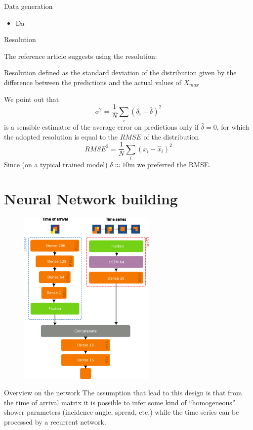 \documentclass{beamer}
\begin{document}
\begin{frame}{Data generation}
    \begin{itemize}
        \item Da
    \end{itemize}
\end{frame}


\begin{frame}{Resolution}

    The reference article suggests using the resolution:
    \begin{block}{Resolution}
        defined as the standard deviation of the distribution given by the difference between the predictions and the actual values of $X_{max}$
    \end{block}

    We point out that 
    \[\sigma^2 = \frac{1}{N}\sum_i (\delta_i - \bar{\delta})^2\]
    is a sensible estimator of the average error on predictions only if $\bar{\delta} = 0$, for which the adopted resolution is equal 
    to the $RMSE$ of the distribution
    \[ RMSE^2 = \frac{1}{N}\sum_i(x_i - \hat{x}_i)^2 \]
    Since (on a typical trained model) $\bar{\delta} \approx 10$m we preferred the RMSE.
\end{frame}


\section{Neural Network building}
    \begin{figure}
        \centering
        \includegraphics[width=0.6\textwidth]{figures/model.pdf}
    \end{figure}
\begin{frame}{Overview on the network}
    The assumption that lead to this design is that from the time of arrival matrix
    it is possible to infer some kind of ``homogeneous'' shower parameters (incidence angle, spread, etc.)
    while the time series can be processed by a recurrent network.
\end{frame}
\end{document}
